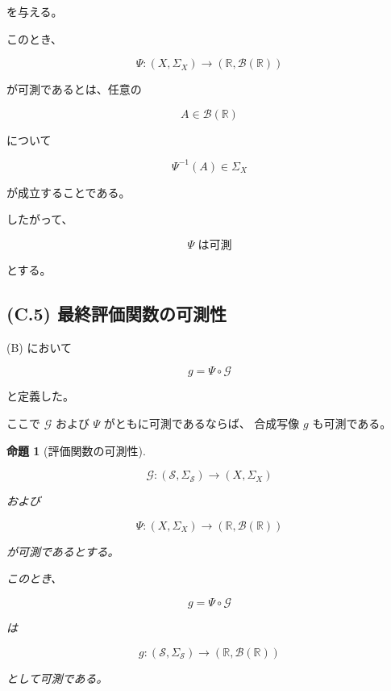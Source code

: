 \documentclass[a4paper,11pt]{article}
\newtheorem{proposition}[definition]{命題}
\newcommand{\Solver}{\mathcal{S}}
\newcommand{\R}{\mathbb{R}}
\begin{document}
を与える。

このとき、

\begin{equation}
    \Psi:
    (X,\Sigma_X)
    \longrightarrow
    (\R,\mathcal{B}(\R))
\end{equation}

が可測であるとは、任意の

\begin{equation}
    A\in\mathcal{B}(\R)
\end{equation}

について

\begin{equation}
    \Psi^{-1}(A)
    \in
    \Sigma_X
\end{equation}

が成立することである。

したがって、

\begin{equation}
    \boxed{
        \Psi
        \text{ は可測}
    }
    \label{eq:C-Psi-measurable}
\end{equation}

とする。


\subsection{(C.5) 最終評価関数の可測性}
\label{subsec:C5}

(B) において

\begin{equation}
    g
    =
    \Psi\circ\mathcal{G}
\end{equation}

と定義した。

ここで $\mathcal{G}$ および $\Psi$ がともに可測であるならば、
合成写像 $g$ も可測である。

\begin{proposition}[評価関数の可測性]
\label{prop:C-measurability}

\begin{equation}
    \mathcal{G}:
    (\Solver,\Sigma_{\Solver})
    \longrightarrow
    (X,\Sigma_X)
\end{equation}

および

\begin{equation}
    \Psi:
    (X,\Sigma_X)
    \longrightarrow
    (\R,\mathcal{B}(\R))
\end{equation}

が可測であるとする。

このとき、

\begin{equation}
    g
    =
    \Psi\circ\mathcal{G}
\end{equation}

は

\begin{equation}
    g:
    (\Solver,\Sigma_{\Solver})
    \longrightarrow
    (\R,\mathcal{B}(\R))
\end{equation}

として可測である。
\end{proposition}
\end{document}
